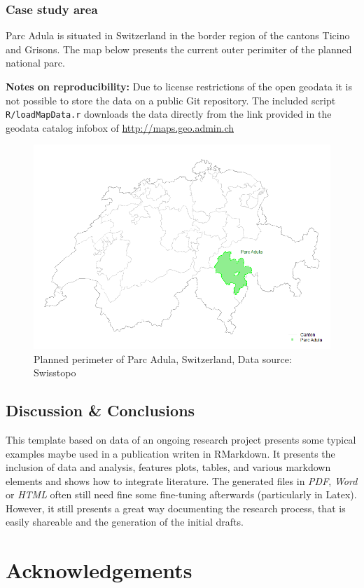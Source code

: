 \documentclass[]{article}
\begin{document}
\subsubsection{Case study area}\label{case-study-area}

Parc Adula is situated in Switzerland in the border region of the
cantons Ticino and Grisons. The map below presents the current outer
perimiter of the planned national parc.

\textbf{Notes on reproducibility:} Due to license restrictions of the
open geodata it is not possible to store the data on a public Git
repository. The included script \texttt{R/loadMapData.r} downloads the
data directly from the link provided in the geodata catalog infobox of
\url{http://maps.geo.admin.ch}

\begin{figure}
\includegraphics[width=0.6\linewidth]{figures/map} \caption{Planned perimeter of Parc Adula, Switzerland, Data source: Swisstopo}\label{fig:map}
\end{figure}

\subsection{Discussion \& Conclusions}\label{discussion-conclusions}

This template based on data of an ongoing research project presents some
typical examples maybe used in a publication writen in RMarkdown. It
presents the inclusion of data and analysis, features plots, tables, and
various markdown elements and shows how to integrate literature. The
generated files in \emph{PDF}, \emph{Word} or \emph{HTML} often still
need fine some fine-tuning afterwards (particularly in Latex). However,
it still presents a great way documenting the research process, that is
easily shareable and the generation of the initial drafts.

\section{Acknowledgements}\label{acknowledgements}
\end{document}
